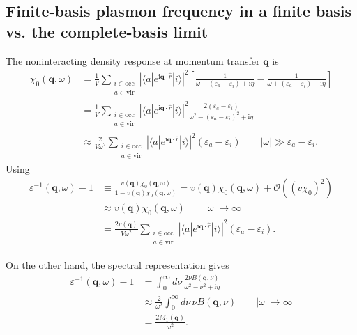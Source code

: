 \documentclass[11pt]{article}
\newcommand{\bq}{\mathbf{q}}
\newcommand{\eps}{\varepsilon}
\newcommand{\ii}{\mathrm{i}}
\begin{document}
\subsection{Finite-basis plasmon frequency in a finite basis vs. the complete-basis limit}
The noninteracting density response at momentum transfer $\bq$ is
\begin{align}
  \chi_0(\bq,\omega)
  &=
  \frac{1}{V}
  \sum_{\substack{i\in\mathrm{occ}\\a\in\mathrm{vir}}}
  \left|
  \langle a|e^{\ii\bq\cdot\hat r}|i\rangle
  \right|^2
  \left[
  \frac{1}{\omega-(\eps_a-\eps_i)+\ii\eta}
  -
  \frac{1}{\omega+(\eps_a-\eps_i)-\ii\eta}
  \right]
  \\[4pt]
  &=
  \frac{1}{V}
  \sum_{\substack{i\in\mathrm{occ}\\a\in\mathrm{vir}}}
  \left|
  \langle a|e^{\ii\bq\cdot\hat r}|i\rangle
  \right|^2
  \frac{2(\eps_a-\eps_i)}
  {\omega^2-(\eps_a-\eps_i)^2+\ii\eta}
  \label{eq:chi0-spectral} \\
&\approx   \frac{2}{V\omega^2}
  \sum_{\substack{i\in\mathrm{occ}\\a\in\mathrm{vir}}}
  \left|
  \langle a|e^{\ii\bq\cdot\hat r}|i\rangle
  \right|^2
  (\eps_a-\eps_i) \qquad |\omega|\gg \eps_a-\eps_i.
  \label{eq:chi0-high-frequency}
\end{align}
Using
\begin{align}
  \eps^{-1}(\bq,\omega)-1
&\equiv \frac{v(\bq)\chi_0(\bq,\omega)}{1-v(\bq)\chi_0(\bq,\omega)} = v(\bq)\chi_0(\bq,\omega) + \mathcal{O}\!\left((v\chi_0)^2\right) \\
  &\approx
  v(\bq)\chi_0(\bq,\omega)
  \qquad |\omega|\rightarrow\infty\\
  &=
  \frac{2v(\bq)}{V\omega^2}
  \sum_{\substack{i\in\mathrm{occ}\\a\in\mathrm{vir}}}
  \left|
  \langle a|e^{\ii\bq\cdot\hat r}|i\rangle
  \right|^2
  (\eps_a-\eps_i).
  \label{eq:epsinv-high-frequency}
\end{align}

On the other hand, the spectral representation gives
\begin{align}
  \eps^{-1}(\bq,\omega)-1
  &=
  \int_0^\infty d\nu\,
  \frac{2\nu B(\bq,\nu)}
  {\omega^2-\nu^2+\ii\eta}
  \\[4pt]
  &\approx
  \frac{2}{\omega^2}
  \int_0^\infty d\nu\,\nu B(\bq,\nu)
    \qquad |\omega|\rightarrow\infty\\
  &=
  \frac{2M_1(\bq)}{\omega^2}.
  \label{eq:epsinv-high-frequency-spectral}
\end{align}
\end{document}

